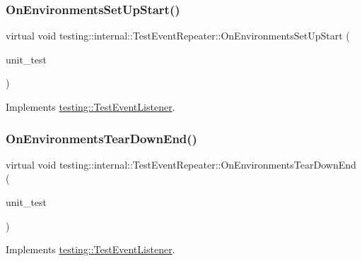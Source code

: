\subsubsection{\texorpdfstring{OnEnvironmentsSetUpStart()}{OnEnvironmentsSetUpStart()}}
{\footnotesize\ttfamily virtual void testing\+::internal\+::\+Test\+Event\+Repeater\+::\+On\+Environments\+Set\+Up\+Start (\begin{DoxyParamCaption}\item[{const \mbox{\hyperlink{classtesting_1_1UnitTest}{Unit\+Test}} \&}]{unit\+\_\+test }\end{DoxyParamCaption})\hspace{0.3cm}{\ttfamily [virtual]}}



Implements \mbox{\hyperlink{classtesting_1_1TestEventListener_aa6502e534919605be45f26a6daf9a40c}{testing\+::\+Test\+Event\+Listener}}.

\mbox{\label{classtesting_1_1internal_1_1TestEventRepeater_a8428220c4cf9f0cea2dfd9a70f07ab7f}} 
\subsubsection{\texorpdfstring{OnEnvironmentsTearDownEnd()}{OnEnvironmentsTearDownEnd()}}
{\footnotesize\ttfamily virtual void testing\+::internal\+::\+Test\+Event\+Repeater\+::\+On\+Environments\+Tear\+Down\+End (\begin{DoxyParamCaption}\item[{const \mbox{\hyperlink{classtesting_1_1UnitTest}{Unit\+Test}} \&}]{unit\+\_\+test }\end{DoxyParamCaption})\hspace{0.3cm}{\ttfamily [virtual]}}



Implements \mbox{\hyperlink{classtesting_1_1TestEventListener_a9ea04fa7f447865ba76df35e12ba2092}{testing\+::\+Test\+Event\+Listener}}.

\mbox{\label{classtesting_1_1internal_1_1TestEventRepeater_a30db75df2d9a65d787f31e16004613c2}} 
